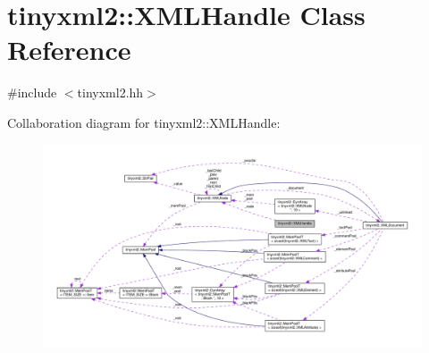 \hypertarget{classtinyxml2_1_1XMLHandle}{}\section{tinyxml2\+:\+:X\+M\+L\+Handle Class Reference}
\label{classtinyxml2_1_1XMLHandle}


{\ttfamily \#include $<$tinyxml2.\+hh$>$}



Collaboration diagram for tinyxml2\+:\+:X\+M\+L\+Handle\+:
\nopagebreak
\begin{figure}[H]
\begin{center}
\leavevmode
\includegraphics[width=350pt]{classtinyxml2_1_1XMLHandle__coll__graph}
\end{center}
\end{figure}
